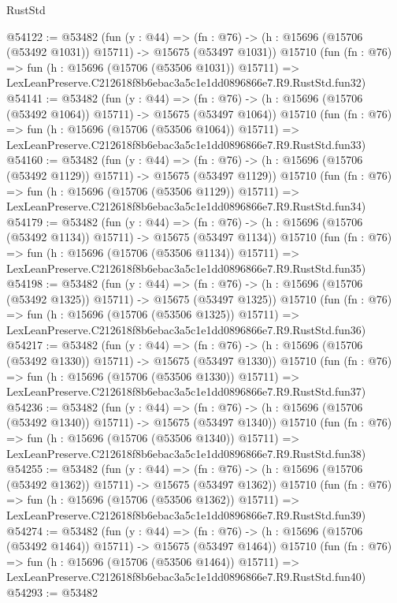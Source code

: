 \begin{lexlean}{RustStd}
\begin{coremodule}
@54122 := @53482
    (fun (y : @44) =>
    (fn : @76) -> (h : @15696 (@15706 (@53492 @1031)) @15711) -> @15675 (@53497 @1031))
    @15710
    (fun (fn : @76) =>
    fun (h : @15696 (@15706 (@53506 @1031)) @15711) =>
    LexLeanPreserve.C212618f8b6ebac3a5c1e1dd0896866e7.R9.RustStd.fun32)
@54141 := @53482
    (fun (y : @44) =>
    (fn : @76) -> (h : @15696 (@15706 (@53492 @1064)) @15711) -> @15675 (@53497 @1064))
    @15710
    (fun (fn : @76) =>
    fun (h : @15696 (@15706 (@53506 @1064)) @15711) =>
    LexLeanPreserve.C212618f8b6ebac3a5c1e1dd0896866e7.R9.RustStd.fun33)
@54160 := @53482
    (fun (y : @44) =>
    (fn : @76) -> (h : @15696 (@15706 (@53492 @1129)) @15711) -> @15675 (@53497 @1129))
    @15710
    (fun (fn : @76) =>
    fun (h : @15696 (@15706 (@53506 @1129)) @15711) =>
    LexLeanPreserve.C212618f8b6ebac3a5c1e1dd0896866e7.R9.RustStd.fun34)
@54179 := @53482
    (fun (y : @44) =>
    (fn : @76) -> (h : @15696 (@15706 (@53492 @1134)) @15711) -> @15675 (@53497 @1134))
    @15710
    (fun (fn : @76) =>
    fun (h : @15696 (@15706 (@53506 @1134)) @15711) =>
    LexLeanPreserve.C212618f8b6ebac3a5c1e1dd0896866e7.R9.RustStd.fun35)
@54198 := @53482
    (fun (y : @44) =>
    (fn : @76) -> (h : @15696 (@15706 (@53492 @1325)) @15711) -> @15675 (@53497 @1325))
    @15710
    (fun (fn : @76) =>
    fun (h : @15696 (@15706 (@53506 @1325)) @15711) =>
    LexLeanPreserve.C212618f8b6ebac3a5c1e1dd0896866e7.R9.RustStd.fun36)
@54217 := @53482
    (fun (y : @44) =>
    (fn : @76) -> (h : @15696 (@15706 (@53492 @1330)) @15711) -> @15675 (@53497 @1330))
    @15710
    (fun (fn : @76) =>
    fun (h : @15696 (@15706 (@53506 @1330)) @15711) =>
    LexLeanPreserve.C212618f8b6ebac3a5c1e1dd0896866e7.R9.RustStd.fun37)
@54236 := @53482
    (fun (y : @44) =>
    (fn : @76) -> (h : @15696 (@15706 (@53492 @1340)) @15711) -> @15675 (@53497 @1340))
    @15710
    (fun (fn : @76) =>
    fun (h : @15696 (@15706 (@53506 @1340)) @15711) =>
    LexLeanPreserve.C212618f8b6ebac3a5c1e1dd0896866e7.R9.RustStd.fun38)
@54255 := @53482
    (fun (y : @44) =>
    (fn : @76) -> (h : @15696 (@15706 (@53492 @1362)) @15711) -> @15675 (@53497 @1362))
    @15710
    (fun (fn : @76) =>
    fun (h : @15696 (@15706 (@53506 @1362)) @15711) =>
    LexLeanPreserve.C212618f8b6ebac3a5c1e1dd0896866e7.R9.RustStd.fun39)
@54274 := @53482
    (fun (y : @44) =>
    (fn : @76) -> (h : @15696 (@15706 (@53492 @1464)) @15711) -> @15675 (@53497 @1464))
    @15710
    (fun (fn : @76) =>
    fun (h : @15696 (@15706 (@53506 @1464)) @15711) =>
    LexLeanPreserve.C212618f8b6ebac3a5c1e1dd0896866e7.R9.RustStd.fun40)
@54293 := @53482

\end{coremodule}
\end{lexlean}
